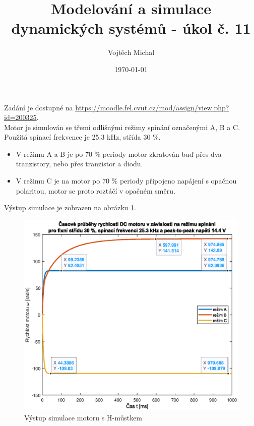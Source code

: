 \documentclass[twoside]{article}
\title{Modelování a simulace dynamických systémů - úkol č. 11}
\author{Vojtěch Michal}
\date{\today}
\begin{document}
\maketitle

Zadání je dostupné na \url{https://moodle.fel.cvut.cz/mod/assign/view.php?id=200325}. \\

Motor je simulován se třemi odlišnými režimy spínání označenými A, B a C.
Použitá spínací frekvence je 25.3 kHz, střída 30 \%.
\begin{itemize}
	\item V režimu A a B je po 70 \% periody motor zkratován buď přes
	dva tranzistory, nebo přes tranzistor a diodu.
	\item V režimu C je na motor po 70 \% periody připojeno napájení s opačnou 
	polaritou, motor se proto roztáčí v opačném směru. 
\end{itemize}

Výstup simulace je zobrazen na obrázku \ref{fig:rychlosti}.

\begin{figure}[htbp]
	\centering
	\includegraphics[width=\linewidth]{rychlosti.eps}
	\caption{Výstup simulace motoru s H-můstkem}
	\label{fig:rychlosti}
\end{figure}
\end{document}
